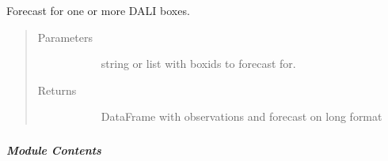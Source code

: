 \documentclass[letterpaper,10pt,english]{sphinxmanual}
\begin{document}
\begin{fulllineitems}
\label{\detokenize{autoapi/src/forecast/forecast/index:src.forecast.forecast.forecast}}
Forecast for one or more DALI boxes.
\begin{quote}\begin{description}
\item[{Parameters}] \leavevmode\begin{description}
\item[{}] \leavevmode{[}\sphinxhref{https://docs.python.org/3/library/stdtypes.html\#list}{\sphinxcode{\sphinxupquote{list}}}{]}
string or list with boxids to forecast for.

\end{description}

\item[{Returns}] \leavevmode\begin{description}
\item[{}] \leavevmode
DataFrame with observations and forecast on long format

\end{description}

\end{description}\end{quote}

\end{fulllineitems}



\subparagraph{}
\label{\detokenize{autoapi/src/forecast/make_forecasts/index:module-src.forecast.make_forecasts}}\label{\detokenize{autoapi/src/forecast/make_forecasts/index:src-forecast-make-forecasts}}\label{\detokenize{autoapi/src/forecast/make_forecasts/index::doc}}

\subparagraph{Module Contents}
\label{\detokenize{autoapi/src/forecast/make_forecasts/index:module-contents}}

\begin{fulllineitems}
\label{\detokenize{autoapi/src/forecast/make_forecasts/index:src.forecast.make_forecasts.logger}}
\end{fulllineitems}
\end{document}
